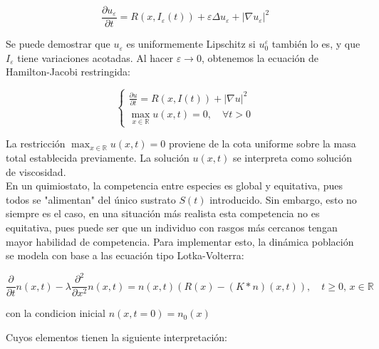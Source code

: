 {    \begin{equation*}
        \frac{\partial u_\varepsilon}{\partial t} = R(x, I_\varepsilon(t)) +   \varepsilon \Delta u_\varepsilon + |\nabla u_\varepsilon|^2
    \end{equation*}

    \normalsize{Se puede demostrar que \( u_\varepsilon \) es uniformemente Lipschitz si \( u_0^\varepsilon \) también lo es, y que \( I_\varepsilon \) tiene variaciones acotadas. Al hacer \( \varepsilon \to 0 \), obtenemos la ecuación de Hamilton-Jacobi restringida:}


    \begin{equation*}
        \begin{cases}
        \frac{\partial u}{\partial t} = R(x, I(t)) + |\nabla u|^2 \\
        \max_{x \in \mathbb{R}} u(x, t) = 0, \quad \forall t > 0
        \end{cases}
    \end{equation*}


    \normalsize{La restricción \( \max_{x \in \mathbb{R}} u(x, t) = 0 \) proviene de la cota uniforme sobre la masa total establecida previamente. La solución \( u(x,t) \) se interpreta como solución de viscosidad.}\\

    \normalsize{\citep{Mirrahimi}En un quimiostato, la competencia entre especies es global y equitativa, pues todos se "alimentan" del único sustrato $S(t)$ introducido. Sin embargo, esto no siempre es el caso, en una situación más realista esta competencia no es equitativa, pues puede ser que un individuo con rasgos más cercanos tengan mayor habilidad de competencia. Para implementar esto, la dinámica población se modela con base a las ecuación tipo Lotka-Volterra:}

    \begin{equation*}
        \frac{\partial}{\partial t} n(x,t) - \lambda \frac{\partial^2}{\partial x^2} n(x,t) = n(x,t) \left( R(x) - (K * n)(x,t) \right), \quad t \geq 0, \, x \in \mathbb{R}
    \end{equation*}

    con la condicion inicial $n(x,t=0)=n_0(x)$

    Cuyos elementos tienen la siguiente interpretación:

}
